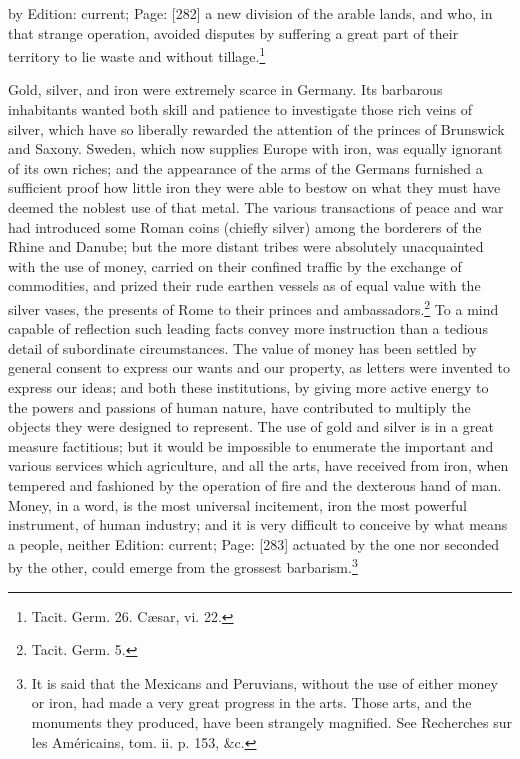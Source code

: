 by Edition: current; Page: [282] a new division of the arable lands, and who, in that strange operation, avoided disputes by suffering a great part of their territory to lie waste and without tillage.\footnote{Tacit. Germ. 26. Cæsar, vi. 22.}

Gold, silver, and iron were extremely scarce in Germany. Its barbarous inhabitants wanted both skill and patience to investigate those rich veins of silver, which have so liberally rewarded the attention of the princes of Brunswick and Saxony. Sweden, which now supplies Europe with iron, was equally ignorant of its own riches; and the appearance of the arms of the Germans furnished a sufficient proof how little iron they were able to bestow on what they must have deemed the noblest use of that metal. The various transactions of peace and war had introduced some Roman coins (chiefly silver) among the borderers of the Rhine and Danube; but the more distant tribes were absolutely unacquainted with the use of money, carried on their confined traffic by the exchange of commodities, and prized their rude earthen vessels as of equal value with the silver vases, the presents of Rome to their princes and ambassadors.\footnote{Tacit. Germ. 5.} To a mind capable of reflection such leading facts convey more instruction than a tedious detail of subordinate circumstances. The value of money has been settled by general consent to express our wants and our property, as letters were invented to express our ideas; and both these institutions, by giving more active energy to the powers and passions of human nature, have contributed to multiply the objects they were designed to represent. The use of gold and silver is in a great measure factitious; but it would be impossible to enumerate the important and various services which agriculture, and all the arts, have received from iron, when tempered and fashioned by the operation of fire and the dexterous hand of man. Money, in a word, is the most universal incitement, iron the most powerful instrument, of human industry; and it is very difficult to conceive by what means a people, neither Edition: current; Page: [283] actuated by the one nor seconded by the other, could emerge from the grossest barbarism.\footnote{It is said that the Mexicans and Peruvians, without the use of either money or iron, had made a very great progress in the arts. Those arts, and the monuments they produced, have been strangely magnified. See Recherches sur les Américains, tom. ii. p. 153, \&c.}

